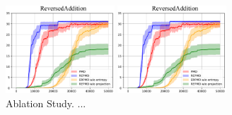 \begin{figure}[t]
\begin{minipage}{0.5\linewidth}
\raggedleft
\includegraphics[width=1.6in]{./ablation.pdf}
\end{minipage}%
\begin{minipage}{0.5\linewidth}
\includegraphics[width=1.6in]{./ablation.pdf}
\end{minipage}%

\caption{Ablation Study. ...}
\label{fig:result_mujoco}
\end{figure}
